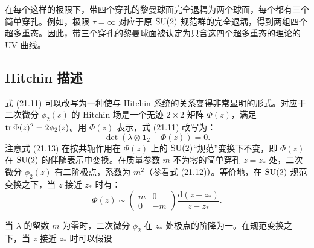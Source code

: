 
在每个这样的极限下，带四个穿孔的黎曼球面完全退耦为两个球面，每个都有三个简单穿孔。例如，极限 $\tau=\infty$ 对应于原 $\operatorname{SU}(2)$ 规范群的完全退耦，得到两组四个超多重态。因此，带三个穿孔的黎曼球面被认定为只含这四个超多重态的理论的 UV 曲线。

\subsection{Hitchin 描述}

式 (21.11) 可以改写为一种使与 Hitchin 系统的关系变得非常显明的形式。对应于二次微分 $\phi_2(s)$ 的 Hitchin 场是一个无迹 $2\times2$ 矩阵 $\Phi(z)$，满足 $\operatorname{tr}\Phi(z)^2=2\phi_2(z)$。用 $\Phi(z)$ 表示，式 (21.11) 改写为：
\begin{equation}
\det(\lambda\otimes\mathbf{1}_2-\Phi(z))=0.
\tag{21.13}
\end{equation}
注意式 (21.13) 在按共轭作用在 $\Phi(z)$ 上的 $\operatorname{SU}(2)$“规范”变换下不变，即 $\Phi(z)$ 在 $\operatorname{SU}(2)$ 的伴随表示中变换。在质量参数 $m$ 不为零的简单穿孔 $z=z_*$ 处，二次微分 $\phi_2(z)$ 有二阶极点，系数为 $m^2$（参看式 (21.12)）。等价地，在 $\operatorname{SU}(2)$ 规范变换之下，当 $z$ 接近 $z_*$ 时有：
\[
\Phi(z)\sim\begin{pmatrix}m&0\\0&-m\end{pmatrix}\frac{\mathrm{d}(z-z_*)}{z-z_*}.
\]

当 $\lambda$ 的留数 $m$ 为零时，二次微分 $\phi_2$ 在 $z_*$ 处极点的阶降为一。在规范变换之下，当 $z$ 接近 $z_*$ 时可以假设

